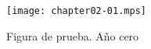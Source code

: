 \documentclass[a4paper]{article}
\begin{document}
\begin{figure}[thbp]
	\begin{center}
		\texttt{[image: chapter02-01.mps]}
	\end{center}
	\caption{Figura de prueba. A\~no cero}
\end{figure}
\end{document}
